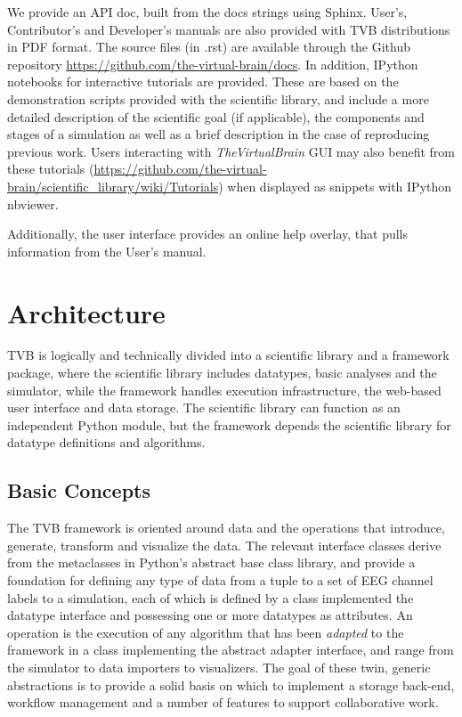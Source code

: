 \documentclass{bioinfo}
\newcommand{\TVB}{\textit{TheVirtualBrain }}
\begin{document}
We provide an API doc, built from the docs strings using Sphinx.
User's, Contributor's and Developer's manuals are also provided with TVB
distributions in PDF format. The source files (in .rst) are available
through the Github repository \url{https://github.com/the-virtual-brain/docs}.  
In addition, IPython notebooks \citep{PerezGranger_2007}
for interactive tutorials are provided. These are based on the
demonstration scripts provided with the scientific library, and
include a more detailed description of the scientific goal (if
applicable), the components and stages of a simulation as well as a
brief description in the case of reproducing previous work. Users
interacting with \TVB GUI may also benefit from these tutorials
(\url{https://github.com/the-virtual-
brain/scientific_library/wiki/Tutorials}) when displayed as snippets
with IPython nbviewer. 

Additionally, the user interface provides an online help overlay, that pulls
information from the User's manual.



\section{Architecture}

TVB is logically and technically divided into a scientific
library and a framework package, where the scientific library includes
datatypes, basic analyses and the simulator, while the
framework handles execution infrastructure, the web-based user interface and
data storage.  The scientific library can function as an independent Python
module, but the framework depends the scientific library for datatype definitions
and algorithms. 

\subsection{Basic Concepts}

The TVB framework is oriented around data and the operations that introduce,
generate, transform and visualize the data. The relevant interface classes
derive from the metaclasses in Python's abstract base class library, and
provide a foundation for defining any type of data from a tuple to a
set of EEG channel labels to a simulation, each of which is defined by a class
implemented the datatype interface and possessing one or more datatypes as 
attributes. An operation is the execution of any algorithm that
has been \emph{adapted} to the framework in a class implementing the abstract
adapter interface, and range from the simulator to data importers to
visualizers.  The goal of these twin, generic abstractions is to provide a
solid basis on which to implement a storage back-end, workflow management and a
number of features to support collaborative work. 
\end{document}
